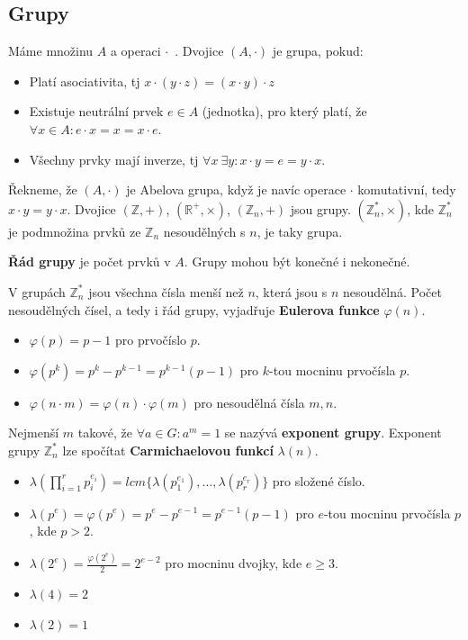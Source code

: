 \subsection{Grupy}
Máme množinu $A$ a operaci $\cdot$~. Dvojice $(A,\cdot)$ je grupa, pokud:
\begin{itemize}
\item Platí asociativita, tj $x\cdot(y\cdot z) = (x\cdot y)\cdot z$
\item Existuje neutrální prvek $e \in A$ (jednotka), pro který platí, že
$\forall x \in A: e\cdot x = x = x \cdot e$.
\item Všechny prvky mají inverze, tj $\forall x ~\exists y: x\cdot y = e = y
\cdot x$.
\end{itemize}
Řekneme, že $(A,\cdot)$ je Abelova grupa, když je navíc operace $\cdot$
komutativní, tedy $x\cdot y = y \cdot x$. Dvojice $(\mathbb{Z}, +)$,
$(\mathbb{R}^+, \times)$,  $(\mathbb{Z}_n, +)$ jsou grupy. $(\mathbb{Z}_n^*,
\times)$, kde $\mathbb{Z}_n^*$ je podmnožina prvků ze $\mathbb{Z}_n$
nesoudělných s $n$, je taky grupa.

\textbf{Řád grupy} je počet prvků v $A$. Grupy mohou být konečné i nekonečné.

V grupách $\mathbb{Z}_n^*$ jsou všechna čísla menší než $n$, která jsou s $n$
nesoudělná. Počet nesoudělných čísel, a tedy i řád grupy, vyjadřuje
\textbf{Eulerova funkce} $\varphi(n)$.
\begin{itemize}
\item $\varphi(p) = p-1$ pro prvočíslo $p$.
\item $\varphi(p^k) = p^k - p^{k-1} = p^{k-1}(p-1)$ pro $k$-tou mocninu
prvočísla $p$.
\item $\varphi(n\cdot m) = \varphi(n)\cdot\varphi(m)$ pro nesoudělná čísla
$m,n$.
\end{itemize}

Nejmenší $m$ takové, že $\forall a \in G: a^m = 1$ se nazývá \textbf{exponent
grupy}. Exponent grupy $\mathbb{Z}_n^*$ lze spočítat \textbf{Carmichaelovou
funkcí} $\lambda(n)$.
\begin{itemize}
\item $\lambda(\prod_{i=1}^r p_i^{e_i}) = lcm\{\lambda(p_1^{e_1}), \ldots,
\lambda(p_r^{e_r})\}$ pro složené číslo.
\item $\lambda(p^e) = \varphi(p^e) = p^e - p^{e-1} = p^{e-1}(p-1)$ pro $e$-tou
mocninu prvočísla $p$, kde $p > 2$.
\item $\lambda(2^e) = \frac{\varphi(2^e)}{2} = 2^{e - 2}$ pro mocninu dvojky,
kde $e \geq 3$.
\item $\lambda(4) = 2$
\item $\lambda(2) = 1$
\end{itemize}

